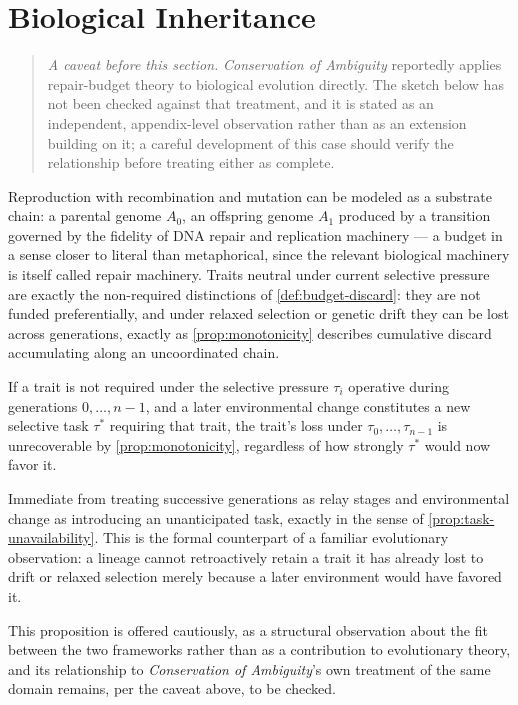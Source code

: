 \section{Biological Inheritance}

\begin{quotation}
\noindent\emph{A caveat before this section.} \emph{Conservation of
Ambiguity} reportedly applies repair-budget theory to biological
evolution directly. The sketch below has not been checked against that
treatment, and it is stated as an independent, appendix-level
observation rather than as an extension building on it; a careful
development of this case should verify the relationship before treating
either as complete.
\end{quotation}

Reproduction with recombination and mutation can be modeled as a
substrate chain: a parental genome $A_0$, an offspring genome $A_1$
produced by a transition governed by the fidelity of DNA repair and
replication machinery --- a budget in a sense closer to literal than
metaphorical, since the relevant biological machinery is itself called
repair machinery. Traits neutral under current selective pressure are
exactly the non-required distinctions of \cref{def:budget-discard}: they
are not funded preferentially, and under relaxed selection or genetic
drift they can be lost across generations, exactly as
\cref{prop:monotonicity} describes cumulative discard accumulating along
an uncoordinated chain.

\begin{proposition}
\label{prop:environment-as-task}
If a trait is not required under the selective pressure $\tau_i$
operative during generations $0, \ldots, n-1$, and a later environmental
change constitutes a new selective task $\tau^*$ requiring that trait,
the trait's loss under $\tau_0, \ldots, \tau_{n-1}$ is unrecoverable by
\cref{prop:monotonicity}, regardless of how strongly $\tau^*$ would now
favor it.
\end{proposition}

\begin{proofsketch}
Immediate from treating successive generations as relay stages and
environmental change as introducing an unanticipated task, exactly in
the sense of \cref{prop:task-unavailability}. This is the formal
counterpart of a familiar evolutionary observation: a lineage cannot
retroactively retain a trait it has already lost to drift or relaxed
selection merely because a later environment would have favored it.
\end{proofsketch}

This proposition is offered cautiously, as a structural observation
about the fit between the two frameworks rather than as a contribution
to evolutionary theory, and its relationship to \emph{Conservation of
Ambiguity}'s own treatment of the same domain remains, per the caveat
above, to be checked.
